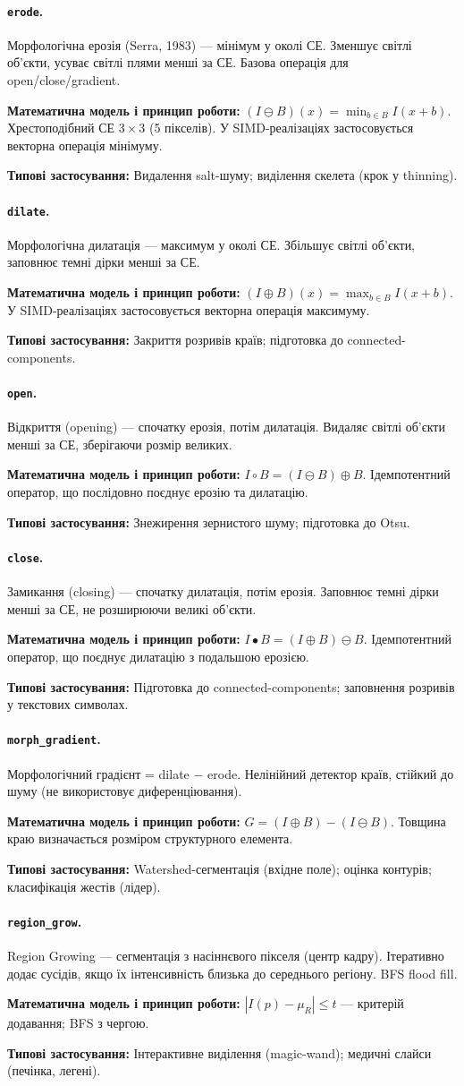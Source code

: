\documentclass[a4paper,12pt]{article}
\newcommand{\algodesc}[6]{%
	\paragraph{\texttt{#1}.} #2

	\textbf{Математична модель і принцип роботи:} #3

	\textbf{Типові застосування:} #6
	\par\medskip
}
\begin{document}
\algodesc{erode}
{Морфологічна ерозія (Serra, 1983) --- мінімум у околі СЕ. Зменшує світлі об'єкти, усуває світлі плями менші за СЕ. Базова операція для open/close/gradient.}
{$(I\ominus B)(x)=\min_{b\in B}I(x+b)$. Хрестоподібний СЕ $3\times3$ (5 пікселів). У SIMD-реалізаціях застосовується векторна операція мінімуму.}
{Ефективно усуває світлий імпульсний шум і спрощує геометрію об'єктів.}
{Робить об'єкти тоншими; може <<з'їсти>> тонкі лінії.}
{Видалення salt-шуму; виділення скелета (крок у thinning).}

\algodesc{dilate}
{Морфологічна дилатація --- максимум у околі СЕ. Збільшує світлі об'єкти, заповнює темні дірки менші за СЕ.}
{$(I\oplus B)(x)=\max_{b\in B}I(x+b)$. У SIMD-реалізаціях застосовується векторна операція максимуму.}
{Заповнює дрібні темні порожнини та з'єднує близькі компоненти.}
{Робить об'єкти товстішими; може злити сусідні компоненти.}
{Закриття розривів країв; підготовка до connected-components.}

\algodesc{open}
{Відкриття (opening) --- спочатку ерозія, потім дилатація. Видаляє світлі об'єкти менші за СЕ, зберігаючи розмір великих.}
{$I\circ B=(I\ominus B)\oplus B$. Ідемпотентний оператор, що послідовно поєднує ерозію та дилатацію.}
{Пригнічує дрібні світлі артефакти без суттєвої зміни форми великих об'єктів.}
{Не повертає стертих тонких ліній.}
{Знежирення зернистого шуму; підготовка до Otsu.}

\algodesc{close}
{Замикання (closing) --- спочатку дилатація, потім ерозія. Заповнює темні дірки менші за СЕ, не розширюючи великі об'єкти.}
{$I\bullet B=(I\oplus B)\ominus B$. Ідемпотентний оператор, що поєднує дилатацію з подальшою ерозією.}
{Заповнює дрібні розриви та порожнини у межах об'єктів.}
{Не відновлює дірки більші за СЕ; може злити сусідні об'єкти.}
{Підготовка до connected-components; заповнення розривів у текстових символах.}

\algodesc{morph\_gradient}
{Морфологічний градієнт = dilate $-$ erode. Нелінійний детектор країв, стійкий до шуму (не використовує диференціювання).}
{$G=(I\oplus B)-(I\ominus B)$. Товщина краю визначається розміром структурного елемента.}
{Формує контурний відгук, стійкий до локальних флуктуацій інтенсивності.}
{Дає товсті краї (товщина $\approx$ розмір СЕ); не дає напрямку градієнта.}
{Watershed-сегментація (вхідне поле); оцінка контурів; класифікація жестів (лідер).}

\algodesc{region\_grow}
{Region Growing --- сегментація з насіннєвого пікселя (центр кадру). Ітеративно додає сусідів, якщо їх інтенсивність близька до середнього регіону. BFS flood fill.}
{$|I(p)-\mu_R|\le t$ --- критерій додавання; BFS з чергою.}
{Вихід --- зв'язний регіон із простим набором керувальних параметрів.}
{Залежить від положення seed; може <<витекти>> через тонкі краї; послідовний (BFS).}
{Інтерактивне виділення (magic-wand); медичні слайси (печінка, легені).}
\end{document}
